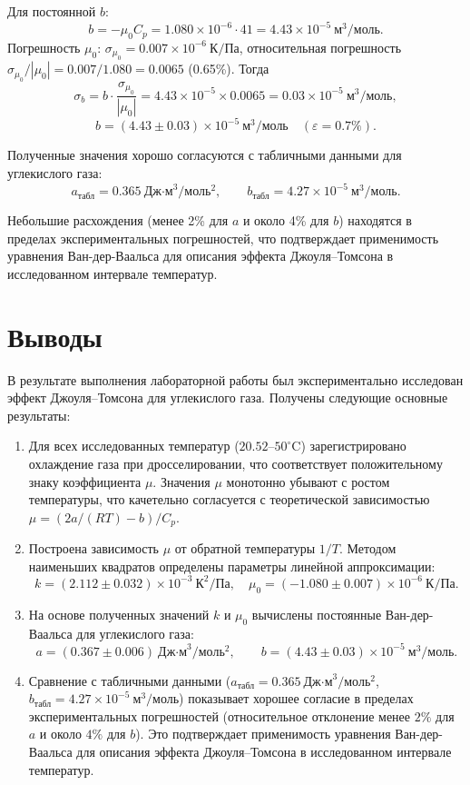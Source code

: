 \documentclass[a4paper, 12pt]{article}
\begin{document}
Для постоянной \(b\):
\[
b = -\mu_0 C_p = 1.080\times10^{-6} \cdot 41 = 4.43\times 10^{-5}\ \text{м}^3/\text{моль}.
\]
Погрешность \(\mu_0\): \(\sigma_{\mu_0} = 0.007\times10^{-6}\ \text{К/Па}\), относительная погрешность \(\sigma_{\mu_0}/|\mu_0| = 0.007/1.080 = 0.0065\) (0.65\%). Тогда
\[
\sigma_b = b \cdot \frac{\sigma_{\mu_0}}{|\mu_0|} = 4.43\times10^{-5} \times 0.0065 = 0.03\times 10^{-5}\ \text{м}^3/\text{моль},
\]
\[
b = (4.43 \pm 0.03)\times 10^{-5}\ \text{м}^3/\text{моль}\quad(\varepsilon = 0.7\%).
\]

Полученные значения хорошо согласуются с табличными данными для углекислого газа:
\[
a_{\text{табл}} = 0.365\ \text{Дж·м}^3/\text{моль}^2,\qquad 
b_{\text{табл}} = 4.27\times 10^{-5}\ \text{м}^3/\text{моль}.
\]

Небольшие расхождения (менее 2\% для \(a\) и около 4\% для \(b\)) находятся в пределах экспериментальных погрешностей, что подтверждает применимость уравнения Ван-дер-Ваальса для описания эффекта Джоуля--Томсона в исследованном интервале температур.

\section*{Выводы}

В результате выполнения лабораторной работы был экспериментально исследован эффект Джоуля–Томсона для углекислого газа. Получены следующие основные результаты:

\begin{enumerate}
    \item Для всех исследованных температур (\(20.52\)–\(50^\circ\)C) зарегистрировано охлаждение газа при дросселировании, что соответствует положительному знаку коэффициента \(\mu\). Значения \(\mu\) монотонно убывают с ростом температуры, что качетельно согласуется с теоретической зависимостью \(\mu = (2a/(RT)-b)/C_p\).

    \item Построена зависимость \(\mu\) от обратной температуры \(1/T\). Методом наименьших квадратов определены параметры линейной аппроксимации:
    \[
    k = (2.112 \pm 0.032)\times 10^{-3}\ \text{К}^2/\text{Па},\quad 
    \mu_0 = (-1.080 \pm 0.007)\times 10^{-6}\ \text{К/Па}.
    \]

    \item На основе полученных значений \(k\) и \(\mu_0\) вычислены постоянные Ван-дер-Ваальса для углекислого газа:
    \[
    a = (0.367 \pm 0.006)\ \text{Дж·м}^3/\text{моль}^2,\qquad 
    b = (4.43 \pm 0.03)\times 10^{-5}\ \text{м}^3/\text{моль}.
    \]

    \item Сравнение с табличными данными (\(a_{\text{табл}} = 0.365\ \text{Дж·м}^3/\text{моль}^2\), \(b_{\text{табл}} = 4.27\times 10^{-5}\ \text{м}^3/\text{моль}\)) показывает хорошее согласие в пределах экспериментальных погрешностей (относительное отклонение менее \(2\%\) для \(a\) и около \(4\%\) для \(b\)). Это подтверждает применимость уравнения Ван-дер-Ваальса для описания эффекта Джоуля–Томсона в исследованном интервале температур.
\end{enumerate}
\end{document}
